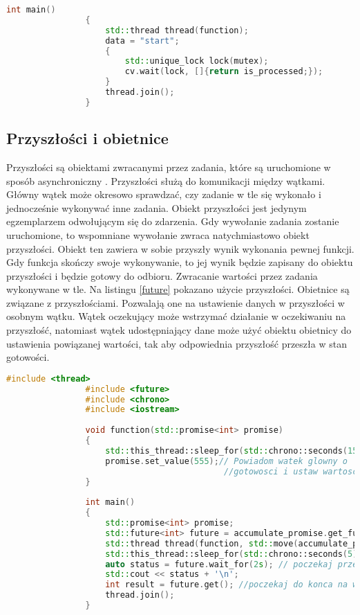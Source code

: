 {{\begin{lstlisting}[caption=Przykład użycia zmiennych warunkowych w języku C++, language=C++, label=cv]
                int main()
                {
                    std::thread thread(function);
                    data = "start";
                    {
                        std::unique_lock lock(mutex);
                        cv.wait(lock, []{return is_processed;});
                    }
                    thread.join();
                }
        \end{lstlisting}
    }

    \newpage
    \subsection{Przyszłości i obietnice}
    {
        Przyszłości są obiektami zwracanymi przez zadania, które są uruchomione w sposób asynchroniczny \cite{threads_williams}. Przyszłości służą do komunikacji między wątkami. Główny wątek może okresowo sprawdzać, czy zadanie w tle się wykonało i jednocześnie wykonywać inne zadania. Obiekt przyszłości jest jedynym egzemplarzem odwołującym się do zdarzenia. Gdy wywołanie zadania zostanie uruchomione, to wspomniane wywołanie zwraca natychmiastowo obiekt przyszłości. Obiekt ten zawiera w sobie przyszły wynik wykonania pewnej funkcji. Gdy funkcja skończy swoje wykonywanie, to jej wynik będzie zapisany do obiektu przyszłości i będzie gotowy do odbioru. Zwracanie wartości przez zadania wykonywane w tle. Na listingu \ref{future} pokazano użycie przyszłości. Obietnice są związane z przyszłościami. Pozwalają one na ustawienie danych w przyszłości w osobnym wątku. Wątek oczekujący może wstrzymać działanie w oczekiwaniu na przyszłość, natomiast wątek udostępniający dane może użyć obiektu obietnicy do ustawienia powiązanej wartości, tak aby odpowiednia przyszłość przeszła w stan gotowości.


        \begin{lstlisting}[caption=Przykład użycia przyszłości w języku C++, language=C++, label=future]
                #include <thread>
                #include <future>
                #include <chrono>
                #include <iostream>
                 
                void function(std::promise<int> promise)
                {
                    std::this_thread::sleep_for(std::chrono::seconds(15));
                    promise.set_value(555);// Powiadom watek glowny o 
                                            //gotowosci i ustaw wartosc
                }
                 
                int main()
                {
                    std::promise<int> promise;
                    std::future<int> future = accumulate_promise.get_future();
                    std::thread thread(function, std::move(accumulate_promise));
                    std::this_thread::sleep_for(std::chrono::seconds(5));
                    auto status = future.wait_for(2s); // poczekaj przez 2 sekundy i sprawdz co sie dzieje 
                    std::cout << status + '\n';
                    int result = future.get(); //poczekaj do konca na wynik i go zwroc
                    thread.join();
                }
        \end{lstlisting}
    }
}